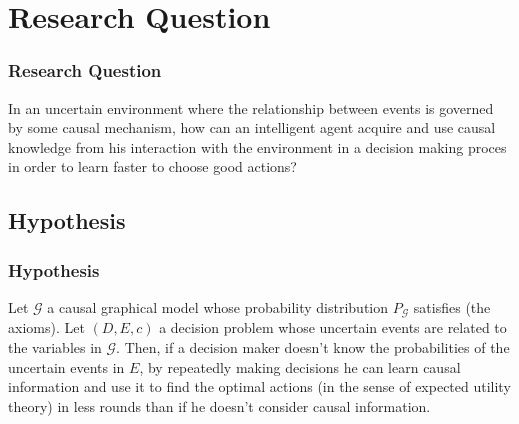 \documentclass{beamer}
\theoremstyle{plain}
\begin{document}
\section{Research Question}
\begin{frame}
\frametitle{Research Question}
In an uncertain environment where the relationship between events is governed by some causal mechanism, how can an intelligent agent acquire and use causal knowledge from his interaction with the environment in a decision making proces in order to learn faster to choose good actions?
\end{frame}

	\subsection{Hypothesis}
	\begin{frame}
	\frametitle{Hypothesis}
Let $\mathcal{G}$ a causal graphical model whose probability distribution $P_\mathcal{G}$ satisfies (the axioms). Let $(D,E,c)$ a decision problem whose uncertain events are related to the variables in $\mathcal{G}$. Then, if a decision maker doesn't know the probabilities of the uncertain events in $E$,  by repeatedly making decisions he can learn causal information and use it to find the optimal actions (in the sense of expected utility theory) in less rounds than if he doesn't consider causal information.
	\end{frame}
\end{document}
